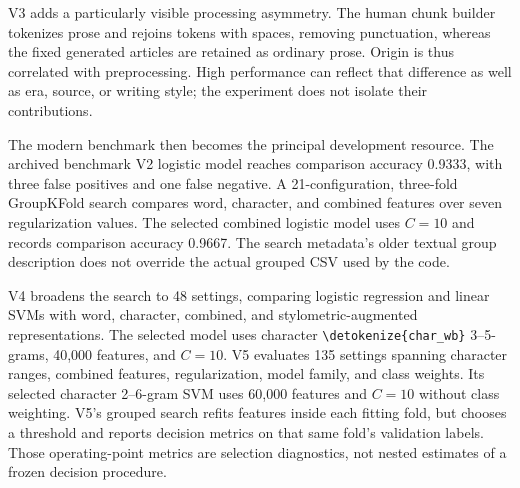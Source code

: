 \documentclass[11pt]{article}
\newcommand{\code}[1]{\expandafter\nolinkurl\expandafter{\detokenize{#1}}}
\begin{document}
V3 adds a particularly visible processing asymmetry. The human chunk builder
tokenizes prose and rejoins tokens with spaces, removing punctuation, whereas
the fixed generated articles are retained as ordinary prose. Origin is thus
correlated with preprocessing. High performance can reflect that difference
as well as era, source, or writing style; the experiment does not isolate
their contributions.

The modern benchmark then becomes the principal development resource.
The archived benchmark V2 logistic model reaches comparison accuracy 0.9333,
with three false positives and one false negative. A 21-configuration,
three-fold GroupKFold search compares word, character, and combined features
over seven regularization values. The selected combined logistic model
uses $C=10$ and records comparison accuracy 0.9667. The search metadata's
older textual group description does not override the actual grouped CSV
used by the code.

V4 broadens the search to 48 settings, comparing logistic regression and
linear SVMs with word, character, combined, and stylometric-augmented
representations. The selected model uses character \code{char_wb} 3--5-grams,
40,000 features, and $C=10$. V5 evaluates 135 settings spanning character
ranges, combined features, regularization, model family, and class weights.
Its selected character 2--6-gram SVM uses 60,000 features and $C=10$ without
class weighting. V5's grouped search refits features inside each fitting
fold, but chooses a threshold and reports decision metrics on that same
fold's validation labels. Those operating-point metrics are selection
diagnostics, not nested estimates of a frozen decision procedure.
\end{document}
